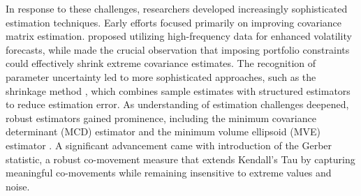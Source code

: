 In response to these challenges, researchers developed increasingly sophisticated estimation techniques. Early efforts focused primarily on improving covariance matrix estimation. \citep{chan1999portfolio, loffler2003effects} proposed utilizing high-frequency data for enhanced volatility forecasts, while \citep{jagannathan2003risk} made the crucial observation that imposing portfolio constraints could effectively shrink extreme covariance estimates. The recognition of parameter uncertainty led to more sophisticated approaches, such as the shrinkage method \citep{ledoit2003improved, ledoit2004well,kourtis2012parameter}, which combines sample estimates with structured estimators to reduce estimation error. As understanding of estimation challenges deepened, robust estimators gained prominence, including the minimum covariance determinant (MCD) estimator \citep{rousseeuw1999fast} and the minimum volume ellipsoid (MVE) estimator \citep{van2009minimum}. A significant advancement came with \cite{gerber2022gerber} introduction of the Gerber statistic, a robust co-movement measure that extends Kendall's Tau by capturing meaningful co-movements while remaining insensitive to extreme values and noise.

